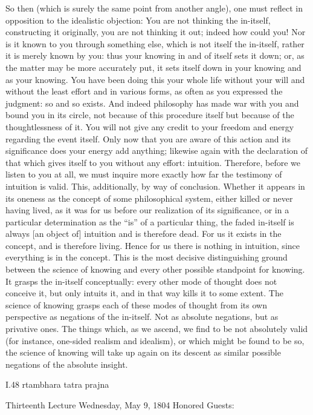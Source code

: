 So then (which is surely the same point from another angle),
one must reflect in opposition
to the idealistic objection:
You are not thinking the in-itself,
constructing it originally,
you are not thinking it out;
indeed how could you!
Nor is it known to you through something else,
which is not itself the in-itself,
rather it is merely known by you:
thus your knowing in and of itself sets it down;
or, as the matter may be more accurately put,
it sets itself down in your knowing
and as your knowing.
You have been doing this your whole life
without your will
and without the least effort
and in various forms,
as often as you expressed the judgment:
so and so exists.
And indeed philosophy has made war with you
and bound you in its circle,
not because of this procedure itself
but because of the thoughtlessness of it.
You will not give any credit to
your freedom and energy regarding the event itself.
Only now that you are aware of
this action and its significance
does your energy add anything;
likewise again with the declaration
of that which gives itself to you without any effort:
intuition.
Therefore, before we listen to you at all,
we must inquire more exactly
how far the testimony of intuition is valid.
This, additionally, by way of conclusion.
Whether it appears in its oneness
as the concept of some philosophical system,
either killed or never having lived,
as it was for us before
our realization of its significance,
or in a particular determination
as the “is” of a particular thing,
the faded in-itself is always [an object of] intuition
and is therefore dead.
For us it exists in the concept,
and is therefore living.
Hence for us there is nothing in intuition,
since everything is in the concept.
This is the most decisive distinguishing ground
between the science of knowing
and every other possible standpoint for knowing.
It grasps the in-itself conceptually:
every other mode of thought does not
conceive it, but only intuits it,
and in that way kills it to some extent.
The science of knowing grasps
each of these modes of thought
from its own perspective
as negations of the in-itself.
Not as absolute negations,
but as privative ones.
The things which, as we ascend,
we find to be not absolutely valid
(for instance, one-sided realism and idealism),
or which might be found to be so,
the science of knowing will take up again
on its descent as similar possible negations
of the absolute insight.

I.48
rtambhara tatra prajna

Thirteenth Lecture
Wednesday, May 9, 1804
Honored Guests:

